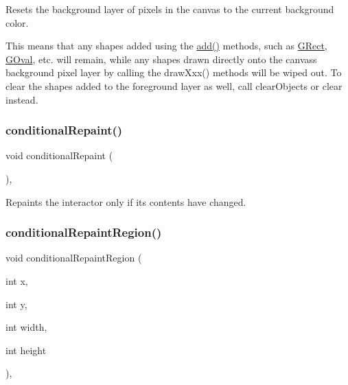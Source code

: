 Resets the background layer of pixels in the canvas to the current background color. 

This means that any shapes added using the \mbox{\hyperlink{classGCanvas_afe8277e7b2627513c6f7452fb0b2847d}{add()}} methods, such as \mbox{\hyperlink{classGRect}{G\+Rect}}, \mbox{\hyperlink{classGOval}{G\+Oval}}, etc. will remain, while any shapes drawn directly onto the canvas\textquotesingle{}s background pixel layer by calling the draw\+Xxx() methods will be wiped out. To clear the shapes added to the foreground layer as well, call clear\+Objects or clear instead. \mbox{\label{classGDrawingSurface_a221b3e75bb3d9d0bfea62b3364e6773b}} 
\subsubsection{\texorpdfstring{conditional\+Repaint()}{conditionalRepaint()}}
{\footnotesize\ttfamily void conditional\+Repaint (\begin{DoxyParamCaption}{ }\end{DoxyParamCaption})\hspace{0.3cm}{\ttfamily [virtual]}, {\ttfamily [inherited]}}



Repaints the interactor only if its contents have changed. 

\mbox{\label{classGDrawingSurface_aedd4b792311d946eeaf44b0de337a408}} 
\subsubsection{\texorpdfstring{conditional\+Repaint\+Region()}{conditionalRepaintRegion()}\hspace{0.1cm}{\footnotesize\ttfamily [1/2]}}
{\footnotesize\ttfamily void conditional\+Repaint\+Region (\begin{DoxyParamCaption}\item[{int}]{x,  }\item[{int}]{y,  }\item[{int}]{width,  }\item[{int}]{height }\end{DoxyParamCaption})\hspace{0.3cm}{\ttfamily [virtual]}, {\ttfamily [inherited]}}



